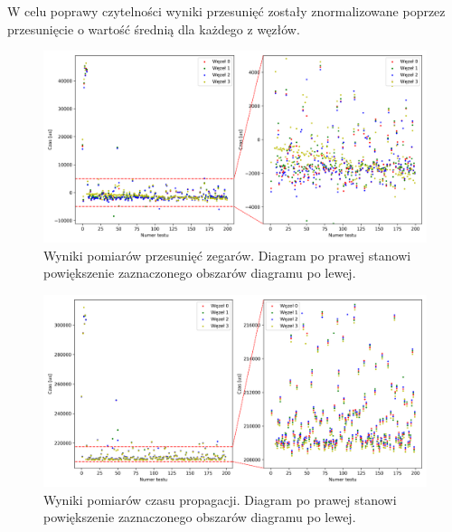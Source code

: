 W celu poprawy czytelności wyniki przesunięć zostały znormalizowane poprzez przesunięcie o wartość średnią dla każdego z węzłów.

\begin{figure}[H]
    \centering
    \includegraphics[width=\textwidth]{pics/ntp_sync/offsets.png}
    \caption[Wyniki pomiarów przesunięć zegarów]{Wyniki pomiarów przesunięć zegarów. Diagram po prawej stanowi powiększenie zaznaczonego obszarów diagramu po lewej.}
    \label{pic:offsets_ntp}
\end{figure}

\begin{figure}[H]
    \centering
    \includegraphics[width=\textwidth]{pics/ntp_sync/prop_times.png}
    \caption[Wyniki pomiarów czasu propagacji]{Wyniki pomiarów czasu propagacji. Diagram po prawej stanowi powiększenie zaznaczonego obszarów diagramu po lewej.}
    \label{pic:prop_times}
\end{figure}


